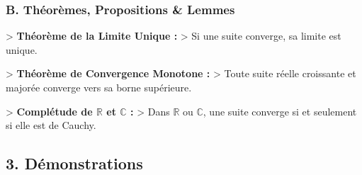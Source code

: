 \documentclass[a4paper,11pt]{report}
\begin{document}
\subsubsection*{B. Théorèmes, Propositions \& Lemmes}
> \textbf{Théorème de la Limite Unique :}
> Si une suite converge, sa limite est unique.

> \textbf{Théorème de Convergence Monotone :}
> Toute suite réelle croissante et majorée converge vers sa borne supérieure.

> \textbf{Complétude de $\mathbb{R}$ et $\mathbb{C}$ :}
> Dans $\mathbb{R}$ ou $\mathbb{C}$, une suite converge si et seulement si elle est de Cauchy.

\subsection*{3. Démonstrations}
\end{document}
